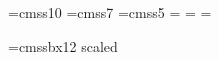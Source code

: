 \def\textsc#1{{\tensc #1}}

\newif\if@emph \@emphfalse
\def\em{\toggle@emph\if@emph\it\else\rm\fi} 
\def\toggle@emph{\if@emph\@emphfalse\else\@emphtrue\fi}
\def\emph#1{{\em #1\/}}

\def\textit#1{{\it #1\/}}
\def\textsl#1{{\sl #1\/}}
\def\textbf#1{{\bf #1}}
\def\texttt#1{{\tt #1}}
\def\textrm#1{{\rm #1}}
\def\mathcal#1{{\cal #1}}

\font\sften=cmss10
\font\sfseven=cmss7
\font\sffive=cmss5
\newfam\sffam
\textfont\sffam=\sften
\scriptfont\sffam=\sfseven
\scriptscriptfont\sffam=\sffive
\def\sf{\fam\sffam\sften}
\def\textsf#1{{\sf#1}}

\def\text#1{{\rm #1}}

\def\oldstylenums#1{\ifmmode{\oldstyle #1}\else${\oldstyle #1}$\fi}


\def\title#1{\gdef\@title{#1}}
\def\author#1{\gdef\@author{#1}}
\long{}
\font\titlefont=cmssbx12 scaled %

\def\@maketitleaddenda{}
\def\@maketitle{\vskip2em%
  \centerline{\titlefont \@title}%
  \vskip1.5em\centerline{\twelverm\@author}%
  \ifx\@date\relax\else\vskip 1em\centerline{\twelverm \@date }\par\fi%
  \vskip 1.5em%
}
\def\maketitle{\@maketitle
  \mbox{ }\par
  \gdef\@maketitle{}
  \mbox{ }\vfill
  \@maketitleaddenda
  \eject}

\def\mbox#1{\leavevmode\hbox{#1}}

\def\strut@{\copy\strutbox@}
\newbox\strutbox@

\newif\ifinany@
\def\Let@{\relax\iffalse{\fi\let\\=\cr\iffalse}\fi}
\def\aligned{\null\,\vcenter\aligned@}
\def\vspace@{\def\vspace##1{\crcr\noalign{\vskip##1\relax}}}
\def\aligned@{\bgroup\vspace@\Let@
 \ifinany@\else\openup\jot\fi\ialign
 \bgroup\hfil\strut@$\m@th\displaystyle{##}$&
 $\m@th\displaystyle{{}##}$\hfil\crcr}
\def\endaligned{\crcr\egroup\egroup}


